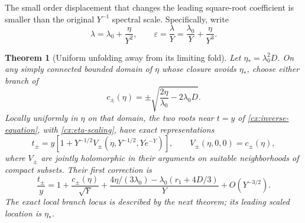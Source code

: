 \documentclass[11pt,a4paper]{article}
\numberwithin{equation}{section}
\newtheorem{theorem}{Theorem}[section]
\theoremstyle{definition}
\theoremstyle{remark}
\begin{document}
The small order displacement that changes the leading square-root
coefficient is smaller than the original $Y^{-1}$ spectral scale.
Specifically, write
\begin{equation}\label{cx:eta-scaling}
 \lambda=\lambda_0+\frac\eta{Y^2},\qquad
 \varepsilon=\frac\lambda Y
   =\frac{\lambda_0}Y+\frac\eta{Y^3}.
\end{equation}

\begin{theorem}[Uniform unfolding away from its limiting fold]
\label{cx:eta-unfolding}
Let $\eta_*=\lambda_0^2D$.  On any simply connected bounded domain of
$\eta$ whose closure avoids $\eta_*$, choose either branch of
\[
 c_\pm(\eta)=\pm\sqrt{\frac{2\eta}{\lambda_0}-2\lambda_0D}.
\]
Locally uniformly in $\eta$ on that domain, the two roots near $t=y$ of
\eqref{cx:inverse-equation}, with \eqref{cx:eta-scaling}, have exact
representations
\begin{equation}\label{cx:eta-chart}
 t_\pm=y\left[1+Y^{-1/2}
       V_\pm\!\left(\eta,Y^{-1/2},Ye^{-Y}\right)\right],
 \qquad V_\pm(\eta,0,0)=c_\pm(\eta),
\end{equation}
where $V_\pm$ are jointly holomorphic in their arguments on suitable
neighborhoods of compact subsets.  Their first correction is
\begin{equation}\label{cx:eta-correction}
 \frac{t_\pm}{y}
 =1+\frac{c_\pm(\eta)}{\sqrt Y}
  +\frac{4\eta/(3\lambda_0)-\lambda_0(r_1+4D/3)}Y
  +O(Y^{-3/2}).
\end{equation}
The exact local branch locus is described by the next theorem; its
leading scaled location is $\eta_*$.
\end{theorem}
\end{document}
